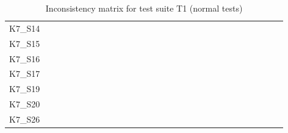 \begin{table}[htpb]
\begin{tabular}{l|rrrrrrrrrrrrrrrrrrrrrrrrrrrr}
        K7\_S14 & \y & \y & \y & \y & \y & \y & \y & \y & \y & \y & \y & \y & \y & \y & \y & \y & \y & \y & \y & \y & \y & \y & \y & \y & \y & \y & \y & \y \\
        K7\_S15 & \y & \y & \y & \y & \y & \y & \y & \y & \y & \y & \y & \y & \y & \y & \y & \y & \y & \y & \y & \y & \y & \y & \y & \y & \y & \y & \y & \y \\
        K7\_S16 & \y & \y & \y & \x & \y & \y & \y & \y & \y & \y & \y & \y & \y & \y & \y & \y & \y & \y & \y & \y & \y & \y & \y & \y & \y & \y & \y & \y \\
        K7\_S17 & \y & \y & \y & \y & \y & \y & \y & \y & \y & \y & \y & \y & \y & \y & \y & \y & \y & \y & \x & \y & \x & \y & \x & \x & \y & \y & \y & \y \\
        K7\_S19 & \y & \y & \y & \y & \y & \y & \y & \y & \y & \y & \y & \y & \y & \y & \y & \y & \y & \y & \y & \y & \y & \y & \y & \y & \y & \y & \y & \y \\
        K7\_S20 & \y & \y & \y & \y & \y & \y & \y & \y & \y & \y & \y & \y & \y & \y & \y & \y & \y & \y & \y & \y & \y & \y & \y & \y & \y & \y & \y & \y \\
        K7\_S26 & \y & \y & \y & \y & \y & \y & \y & \y & \y & \y & \y & \y & \y & \y & \y & \y & \y & \y & \y & \y & \y & \y & \y & \y & \y & \y & \y & \y \\
        \bottomrule
    \end{tabular}
    \caption{Inconsistency matrix for test suite T1 (normal tests)}
    \label{tab:inconsistencies_matrix_normal}
    \setlength{\tabcolsep}{\defaulttabcolsep}
\end{table}

